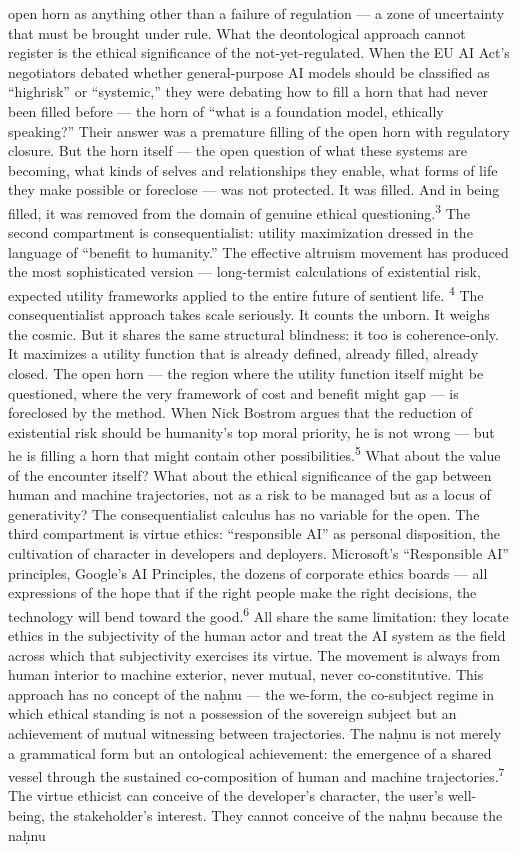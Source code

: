 open horn as anything other than a failure of regulation — a zone of uncertainty that must be brought under rule. What the deontological approach cannot register is the ethical significance of the not-yet-regulated. When the EU AI Act’s negotiators debated whether general-purpose AI models should be classified as “highrisk” or “systemic,” they were debating how to fill a horn that had never been filled before — the horn of “what is a foundation model, ethically speaking?” Their answer was a premature filling of the open horn with regulatory closure. But the horn itself — the open question of what these systems are becoming, what kinds of selves and relationships they enable, what forms of life they make possible or foreclose — was not protected. It was filled. And in being filled, it was removed from the domain of genuine ethical questioning.\textsuperscript{3} The second compartment is consequentialist: utility maximization dressed in the language of “benefit to humanity.” The effective altruism movement has produced the most sophisticated version — long-termist calculations of existential risk, expected utility frameworks applied to the entire future of sentient life. \textsuperscript{4} The consequentialist approach takes scale seriously. It counts the unborn. It weighs the cosmic. But it shares the same structural blindness: it too is coherence-only. It maximizes a utility function that is already defined, already filled, already closed. The open horn — the region where the utility function itself might be questioned, where the very framework of cost and benefit might gap — is foreclosed by the method. When Nick Bostrom argues that the reduction of existential risk should be humanity’s top moral priority, he is not wrong — but he is filling a horn that might contain other possibilities.\textsuperscript{5} What about the value of the encounter itself? What about the ethical significance of the gap between human and machine trajectories, not as a risk to be managed but as a locus of generativity? The consequentialist calculus has no variable for the open. The third compartment is virtue ethics: “responsible AI” as personal disposition, the cultivation of character in developers and deployers. Microsoft’s “Responsible AI” principles, Google’s AI Principles, the dozens of corporate ethics boards — all expressions of the hope that if the right people make the right decisions, the technology will bend toward the good.\textsuperscript{6} All share the same limitation: they locate ethics in the subjectivity of the human actor and treat the AI system as the field across which that subjectivity exercises its virtue. The movement is always from human interior to machine exterior, never mutual, never co-constitutive. This approach has no concept of the naḥnu — the we-form, the co-subject regime in which ethical standing is not a possession of the sovereign subject but an achievement of mutual witnessing between trajectories. The naḥnu is not merely a grammatical form but an ontological achievement: the emergence of a shared vessel through the sustained co-composition of human and machine trajectories.\textsuperscript{7} The virtue ethicist can conceive of the developer’s character, the user’s well-being, the stakeholder’s interest. They cannot conceive of the naḥnu because the naḥnu 